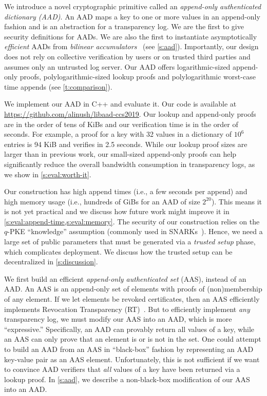 We introduce a novel cryptographic primitive called an \textit{append-only authenticated dictionary (AAD)}.
An AAD maps a key to one or more values in an append-only fashion and is an abstraction for a transparency log.
We are the first to give security definitions for AADs.
We are also the first to instantiate asymptotically \textit{efficient} AADs from \textit{bilinear accumulators}~\cite{acc-bilinear} (see \cref{s:aad}).
Importantly, our design does not rely on collective verification by users or on trusted third parties and assumes only an untrusted log server.
Our AAD offers logarithmic-sized append-only proofs, polylogarithmic-sized lookup proofs and polylogarithmic worst-case time appends (see \cref{t:comparison}).

We implement our AAD in C++ and evaluate it.
Our code is available at \url{https://github.com/alinush/libaad-ccs2019}.
Our lookup and append-only proofs are in the order of tens of KiBs and our verification time is in the order of seconds.
For example, a proof for a key with 32 values in a dictionary of $10^6$ entries is 94 KiB and verifies in 2.5 seconds.
While our lookup proof sizes are larger than in previous work, our small-sized append-only proofs can help significantly reduce the overall bandwidth consumption in transparency logs, as we show in \cref{s:eval:worth-it}.

\tableCompare

Our construction has high append times (i.e., a few seconds per append) and high memory usage (i.e., hundreds of GiBs for an AAD of size $2^{20}$).
This means it is not yet practical and we discuss how future work might improve it in \cref{s:eval:append-time,s:eval:memory}.
The security of our construction relies on the $q$-PKE ``knowledge'' assumption (commonly used in SNARKs~\cite{groth10,GentryWichs2011}).
Hence, we need a large set of public parameters that must be generated via a \textit{trusted setup} phase, which complicates deployment.
We discuss how the trusted setup can be decentralized in \cref{s:discussion}.

\label{s:intro:overview-techniques}
We first build an efficient \textit{append-only authenticated set} (AAS), instead of an AAD.
An AAS is an append-only set of elements with proofs of (non)membership of any element.
If we let elements be revoked certificates, then an AAS efficiently implements Revocation Transparency (RT)~\cite{rev-transparency}.
But to efficiently implement \textit{any} transparency log, we must modify our AAS into an AAD, which is more ``expressive.''
Specifically, an AAD can provably return all values of a key, while an AAS can only prove that an element is or is not in the set.
One could attempt to build an AAD from an AAS in ``black-box'' fashion by representing an AAD key-value pair as an AAS element.
Unfortunately, this is not sufficient if we want to convince AAD verifiers that \textit{all} values of a key have been returned via a lookup proof.
In \cref{s:aad}, we describe a non-black-box modification of our AAS into an AAD.

